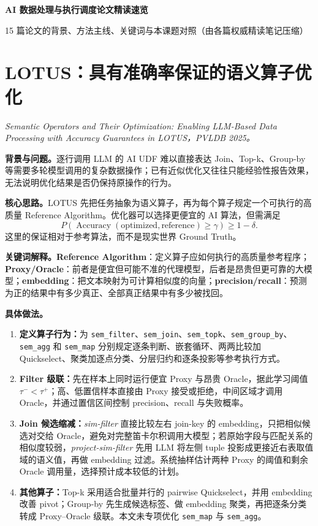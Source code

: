 \documentclass[10pt,a4paper]{ctexart}
\let\digestoriginalsection\section
\renewcommand{\section}{\Needspace{7\baselineskip}\digestoriginalsection}
\newcommand{\paperinfo}[1]{\textit{#1}\par}
\newcommand{\field}[1]{\par\noindent\textbf{#1。}\hspace{0.25em}}
\begin{document}
\begin{center}
  {\LARGE\bfseries AI 数据处理与执行调度论文精读速览}\par
  \vspace{0.25em}
  {\small 15 篇论文的背景、方法主线、关键词与本课题对照（由各篇权威精读笔记压缩）}
\end{center}

\small

\section{LOTUS：具有准确率保证的语义算子优化}
\paperinfo{Semantic Operators and Their Optimization: Enabling LLM-Based Data Processing with Accuracy Guarantees in LOTUS，PVLDB 2025。}

\field{背景与问题}逐行调用 LLM 的 AI UDF 难以直接表达 Join、Top-k、Group-by 等需要多轮模型调用的复杂数据操作；已有近似优化又往往只能经验性报告效果，无法说明优化结果是否仍保持原操作的行为。

\field{核心思路}LOTUS 先把任务抽象为语义算子，再为每个算子规定一个可执行的高质量 Reference Algorithm。优化器可以选择更便宜的 AI 算法，但需满足
\[
P\!\left(\operatorname{Accuracy}(\text{optimized},\text{reference})\geq\gamma\right)\geq1-\delta .
\]
这里的保证相对于参考算法，而不是现实世界 Ground Truth。

\field{关键词解释}\textbf{Reference Algorithm}：定义算子应如何执行的高质量参考程序；\textbf{Proxy/Oracle}：前者是便宜但可能不准的代理模型，后者是昂贵但更可靠的大模型；\textbf{embedding}：把文本映射为可计算相似度的向量；\textbf{precision/recall}：预测为正的结果中有多少真正、全部真正结果中有多少被找回。

\field{具体做法}
\begin{enumerate}
  \item \textbf{定义算子行为：}为 \texttt{sem\_filter}、\texttt{sem\_join}、\texttt{sem\_topk}、\texttt{sem\_group\_by}、\texttt{sem\_agg} 和 \texttt{sem\_map} 分别规定逐条判断、嵌套循环、两两比较加 Quickselect、聚类加逐点分类、分层归约和逐条投影等参考执行方式。
  \item \textbf{Filter 级联：}先在样本上同时运行便宜 Proxy 与昂贵 Oracle，据此学习阈值 $\tau^-<\tau^+$；高、低置信样本直接由 Proxy 接受或拒绝，中间区域才调用 Oracle，并通过置信区间控制 precision、recall 与失败概率。
  \item \textbf{Join 候选缩减：}\emph{sim-filter} 直接比较左右 join-key 的 embedding，只把相似候选对交给 Oracle，避免对完整笛卡尔积调用大模型；若原始字段与匹配关系的相似度较弱，\emph{project-sim-filter} 先用 LLM 将左侧 tuple 投影成更接近右表取值域的语义值，再做 embedding 过滤。系统抽样估计两种 Proxy 的阈值和剩余 Oracle 调用量，选择预计成本较低的计划。
  \item \textbf{其他算子：}Top-k 采用适合批量并行的 pairwise Quickselect，并用 embedding 改善 pivot；Group-by 先生成候选标签、做 embedding 聚类，再把逐条分类转成 Proxy--Oracle 级联。本文未专项优化 \texttt{sem\_map} 与 \texttt{sem\_agg}。
\end{enumerate}
\end{document}
